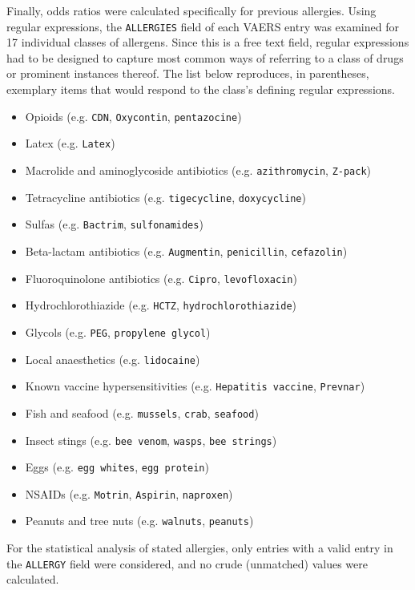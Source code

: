 \documentclass{article}
\begin{document}
Finally, odds ratios were calculated specifically for previous allergies.
Using regular expressions, the \texttt{ALLERGIES} field of each VAERS entry was examined for 17 individual classes of allergens.
Since this is a free text field, regular expressions had to be designed to capture most common ways of referring to a class of drugs or prominent instances thereof.
The list below reproduces, in parentheses, exemplary items that would respond to the class's defining regular expressions.

\begin{itemize}
    \item Opioids (e.g. \texttt{CDN}, \texttt{Oxycontin}, \texttt{pentazocine})
    \item Latex (e.g. \texttt{Latex})
    \item Macrolide and aminoglycoside antibiotics (e.g. \texttt{azithromycin}, \texttt{Z-pack})
    \item Tetracycline antibiotics (e.g. \texttt{tigecycline}, \texttt{doxycycline})
    \item Sulfas (e.g. \texttt{Bactrim}, \texttt{sulfonamides})
    \item Beta-lactam antibiotics (e.g. \texttt{Augmentin}, \texttt{penicillin}, \texttt{cefazolin})
    \item Fluoroquinolone antibiotics (e.g. \texttt{Cipro}, \texttt{levofloxacin})
    \item Hydrochlorothiazide (e.g. \texttt{HCTZ}, \texttt{hydrochlorothiazide})
    \item Glycols (e.g. \texttt{PEG}, \texttt{propylene glycol})
    \item Local anaesthetics (e.g. \texttt{lidocaine})
    \item Known vaccine hypersensitivities (e.g. \texttt{Hepatitis vaccine}, \texttt{Prevnar})
    \item Fish and seafood (e.g. \texttt{mussels}, \texttt{crab}, \texttt{seafood})
    \item Insect stings (e.g. \texttt{bee venom}, \texttt{wasps}, \texttt{bee strings})
    \item Eggs (e.g. \texttt{egg whites}, \texttt{egg protein})
    \item NSAIDs (e.g. \texttt{Motrin}, \texttt{Aspirin}, \texttt{naproxen})
    \item Peanuts and tree nuts (e.g. \texttt{walnuts}, \texttt{peanuts})
\end{itemize}

For the statistical analysis of stated allergies, only entries with a valid entry in the \texttt{ALLERGY} field were considered, and no crude (unmatched) values were calculated.
\end{document}
